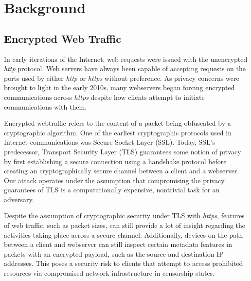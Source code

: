 \documentclass[sigconf,authorversion,nonacm]{acmart}
\begin{document}
\section{Background}
\subsection{Encrypted Web Traffic}
In early iterations of the Internet, web requests were issued with the unencrypted \textit{http} protocol. Web servers have always been capable of accepting requests on the ports used by either \textit{http} or \textit{https} without preference. As privacy concerns were brought to light in the early 2010s, many webservers began forcing encrypted communications across \textit{https} despite how clients attempt to initiate communications with them.

Encrypted webtraffic refers to the content of a packet being obfuscated by a cryptographic algorithm. One of the earliest cryptographic protocols used in Internet communications was Secure Socket Layer (SSL). Today, SSL's predecessor, Transport Security Layer (TLS) guarantees some notion of privacy by first establishing a secure connection using a handshake protocol before creating an cryptographically secure channel between a client and a webserver. Our attack operates under the assumption that compromising the privacy guarantees of TLS is a computationally expensive, nontrivial task for an adversary.

Despite the assumption of cryptographic security under TLS with \textit{https}, features of web traffic, such as packet sizes\citep{herrmann2009website}, can still provide a lot of insight regarding the activities taking place across a secure channel. Additionally, devices on the path between a client and webserver can still inspect certain metadata features in packets with an encrypted payload, such as the source and destination IP addresses. This poses a security risk to clients that attempt to access prohibited resources via compromised network infrastructure in censorship states.
\end{document}

